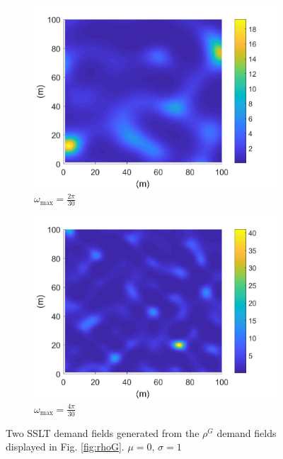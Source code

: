 \documentclass[12pt,dvipsnames]{report}
\begin{document}
\begin{figure}[!ht]
\centering
\begin{subfigure}{.45\textwidth}
	\centering
	\includegraphics[width=1\linewidth]{rho_O2pi-300_L100000_X100_Y100}
	\caption{\small $\omega_{\max}=\frac{2\pi}{30}$}
	\label{fig:rho_2pi-300}
\end{subfigure}
\hspace{0.5cm}
\begin{subfigure}{.45\textwidth}
	\centering
	\includegraphics[width=1\linewidth]{rho_O4pi-300_L100000_X100_Y100}
	\caption{\small $\omega_{\max}=\frac{4\pi}{30}$}
	\label{fig:rho_4pi-300}
\end{subfigure}
\caption[Generated example SSLT demand fields]{\small Two SSLT demand fields generated from the $\rho^G$ demand fields displayed in Fig. \ref{fig:rhoG}. $\mu = 0,\, \sigma = 1$}
\label{fig:rho}
\end{figure}
\end{document}
